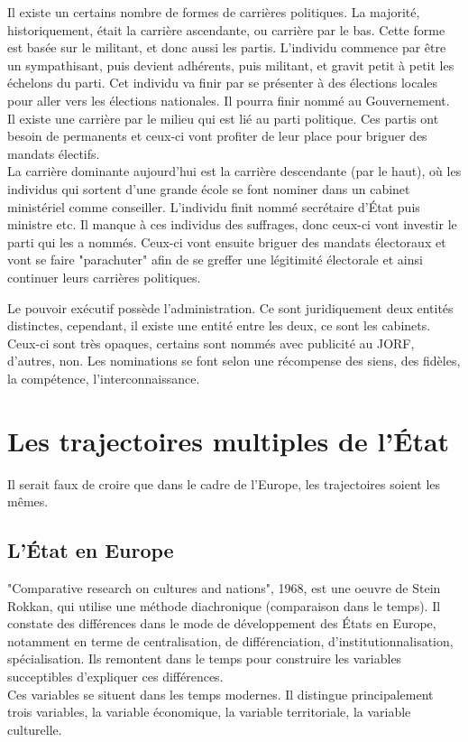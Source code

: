 \documentclass[10pt, a4paper, openany]{book}
\begin{document}
Il existe un certains nombre de formes de carrières politiques. La majorité, historiquement, était la carrière ascendante, ou carrière par le bas. Cette forme est basée sur le militant, et donc aussi les partis. L'individu commence par être un sympathisant, puis devient adhérents, puis militant, et gravit petit à petit les échelons du parti. Cet individu va finir par se présenter à des élections locales pour aller vers les élections nationales. Il pourra finir nommé au Gouvernement. \\
Il existe une carrière par le milieu qui est lié au parti politique. Ces partis ont besoin de permanents et ceux-ci vont profiter de leur place pour briguer des mandats électifs. \\
La carrière dominante aujourd'hui est la carrière descendante (par le haut), où les individus qui sortent d'une grande école se font nominer dans un cabinet ministériel comme conseiller. L'individu finit nommé secrétaire d'État puis ministre etc. Il manque à ces individus des suffrages, donc ceux-ci vont investir le parti qui les a nommés. Ceux-ci vont ensuite briguer des mandats électoraux et vont se faire "parachuter" afin de se greffer une légitimité électorale et ainsi continuer leurs carrières politiques. 


Le pouvoir exécutif possède l'administration. Ce sont juridiquement deux entités distinctes, cependant, il existe une entité entre les deux, ce sont les cabinets. Ceux-ci sont très opaques, certains sont nommés avec publicité au JORF, d'autres, non. Les nominations se font selon une récompense des siens, des fidèles, la compétence, l'interconnaissance. 


\chapter{Les trajectoires multiples de l'État}

Il serait faux de croire que dans le cadre de l'Europe, les trajectoires soient les mêmes.


\section{L'État en Europe}

"Comparative research on cultures and nations", 1968, est une oeuvre de Stein Rokkan, qui utilise une méthode diachronique (comparaison dans le temps). Il constate des différences dans le mode de développement des États en Europe, notamment en terme de centralisation, de différenciation, d'institutionnalisation, spécialisation. Ils remontent dans le temps pour construire les variables succeptibles d'expliquer ces différences. \\
Ces variables se situent dans les temps modernes. Il distingue principalement trois variables, la variable économique, la variable territoriale, la variable culturelle. 
\end{document}

